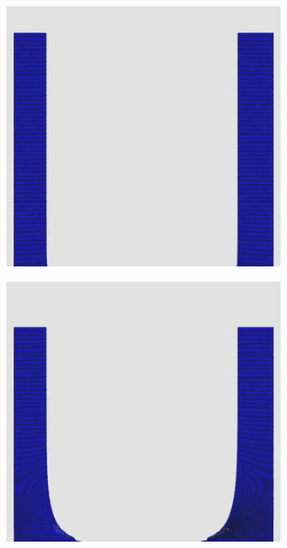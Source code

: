 \documentclass[12pt,a4paper,dvipsnames]{article}
\begin{document}
\begin{figure}[!ht] \centering
	\begin{subfigure}[!h]{0.3\textwidth} \centering
		\includegraphics[width=\textwidth]{DDB/DDB-00.jpg}
	\end{subfigure}
    \begin{subfigure}[!h]{0.3\textwidth} \centering
		\includegraphics[width=\textwidth]{DDB/DDB-01.jpg}

\end{subfigure}
\end{figure}
\end{document}
